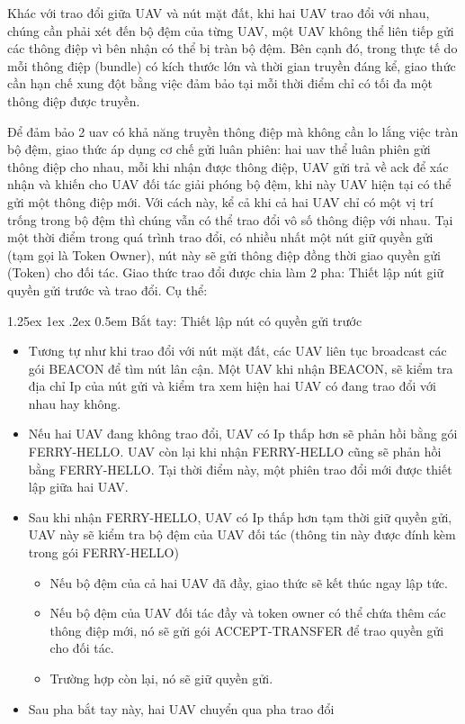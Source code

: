 \documentclass[a4paper]{article}
\makeatletter
\renewcommand{\paragraph}{%
  \@startsection{paragraph}{4}{\z@}%
  {1.25ex \@plus 1ex \@minus .2ex}%
  {0.5em}%
  {\normalfont\normalsize\bfseries}%
}
\makeatother
\begin{document}
Khác với trao đổi giữa UAV và nút mặt đất, khi hai UAV trao đổi với nhau, chúng cần phải xét đến bộ đệm của từng UAV, một UAV không thể liên tiếp gửi các thông điệp vì bên nhận có thể bị tràn bộ đệm. Bên cạnh đó, trong thực tế do mỗi thông điệp (bundle) có kích thước lớn và thời gian truyền đáng kể, giao thức cần hạn chế xung đột bằng việc đảm bảo tại mỗi thời điểm chỉ có tối đa một thông điệp được truyền.

Để đảm bảo 2 uav có khả năng truyền thông điệp mà không cần lo lắng việc tràn bộ đệm, giao thức áp dụng cơ chế gửi luân phiên: hai uav thể luân phiên gửi thông điệp cho nhau, mỗi khi nhận được thông điệp, UAV gửi trả về ack để xác nhận và khiến cho UAV đối tác giải phóng bộ đệm, khi này UAV hiện tại có thể gửi một thông điệp mới. Với cách này, kể cả khi cả hai UAV chỉ có một vị trí trống trong bộ đệm thì chúng vẫn có thể trao đổi vô số thông điệp với nhau. Tại một thời điểm trong quá trình trao đổi, có nhiều nhất một nút giữ quyền gửi (tạm gọi là Token Owner), nút này sẽ gửi thông điệp đồng thời giao quyền gửi (Token) cho đối tác.
Giao thức trao đổi được chia làm 2 pha: Thiết lập nút giữ quyền gửi trước và trao đổi. Cụ thể:

\paragraph{Bắt tay: Thiết lập nút có quyền gửi trước}
\begin{itemize}
  \item Tương tự như khi trao đổi với nút mặt đất, các UAV liên tục broadcast các gói BEACON để tìm nút lân cận. Một UAV khi nhận BEACON, sẽ kiểm tra địa chỉ Ip của nút gửi và kiểm tra xem hiện hai UAV có đang trao đổi với nhau hay không.
  \item Nếu hai UAV đang không trao đổi, UAV có Ip thấp hơn sẽ phản hồi bằng gói FERRY-HELLO. UAV còn lại khi nhận FERRY-HELLO cũng sẽ phản hồi bằng FERRY-HELLO. Tại thời điểm này, một phiên trao đổi mới được thiết lập giữa hai UAV.
  \item Sau khi nhận FERRY-HELLO, UAV có Ip thấp hơn tạm thời giữ quyền gửi, UAV này sẽ kiểm tra bộ đệm của UAV đối tác (thông tin này được đính kèm trong gói FERRY-HELLO)
  \begin{itemize}
    \item Nếu bộ đệm của cả hai UAV đã đầy, giao thức sẽ kết thúc ngay lập tức.
    \item Nếu bộ đệm của UAV đối tác đầy và token owner có thể chứa thêm các thông điệp mới, nó sẽ gửi gói ACCEPT-TRANSFER để trao quyền gửi cho đối tác.
    \item Trường hợp còn lại, nó sẽ giữ quyền gửi.
  \end{itemize}
  \item Sau pha bắt tay này, hai UAV chuyển qua pha trao đổi
\end{itemize}
\end{document}
